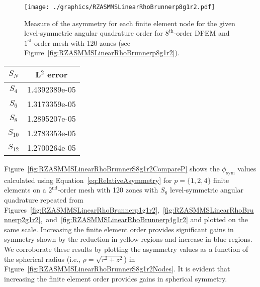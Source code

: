 \documentclass[12pt]{article}
\begin{document}
\begin{figure}[!htb]
\centering
\texttt{[image: ./graphics/RZASMMSLinearRhoBrunnerp8g1r2.pdf]}
\caption{Measure of the asymmetry for each finite element node for the given level-symmetric angular quadrature order for $8^\text{th}$-order DFEM and $1^\text{st}$-order mesh with 120 zones (see Figure~\ref{fig:RZASMMSLinearRhoBrunnerp8g1r2}).}
\label{fig:RZASMMSLinearRhoBrunnerp8g1r2Nodes}
\end{figure}

\begin{table}[!htb]
\centering
{\renewcommand{\arraystretch}{1.5}
\begin{tabular}{|c|c|}
\hline
$S_N$ & L$^2$ error \\\hline
$S_4$ & 1.4392389e-05 \\\hline
$S_6$ & 1.3173359e-05 \\\hline
$S_8$ & 1.2895207e-05 \\\hline
$S_{10}$ & 1.2783353e-05 \\\hline
$S_{12}$ & 1.2700264e-05 \\\hline
\end{tabular}}
\end{table}

\FloatBarrier

Figure~\ref{fig:RZASMMSLinearRhoBrunnerS8g1r2CompareP} shows the $\phi_\text{sym}$ values calculated using Equation~\ref{eq:RelativeAsymmetry} for $p=\{1,2,4\}$ finite elements on a $2^\text{nd}$-order mesh with 120 zones with $S_8$ level-symmetric angular quadrature repeated from Figures~\ref{fig:RZASMMSLinearRhoBrunnerp1g1r2},~\ref{fig:RZASMMSLinearRhoBrunnerp2g1r2},~and~\ref{fig:RZASMMSLinearRhoBrunnerp4g1r2} and plotted on the same scale. Increasing the finite element order provides significant gains in symmetry shown by the reduction in yellow regions and increase in blue regions. We corroborate these results by plotting the asymmetry values as a function of the spherical radius (i.e., $\rho=\sqrt{r^2+z^2}$) in Figure~\ref{fig:RZASMMSLinearRhoBrunnerS8g1r2Nodes}. It is evident that increasing the finite element order provides gains in spherical symmetry.
\end{document}
